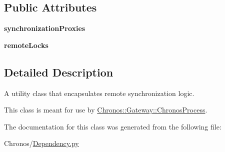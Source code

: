 \subsection*{Public Attributes}
\begin{DoxyCompactItemize}
\item 
{\bfseries synchronization\+Proxies}
\item 
{\bfseries remote\+Locks}
\end{DoxyCompactItemize}


\subsection{Detailed Description}
A utility class that encapsulates remote synchronization logic. 

This class is meant for use by \hyperlink{classChronos_1_1Gateway_1_1ChronosProcess}{Chronos\+::\+Gateway\+::\+Chronos\+Process}. 

The documentation for this class was generated from the following file\+:\begin{DoxyCompactItemize}
\item 
Chronos/\hyperlink{Dependency_8py}{Dependency.\+py}\end{DoxyCompactItemize}
